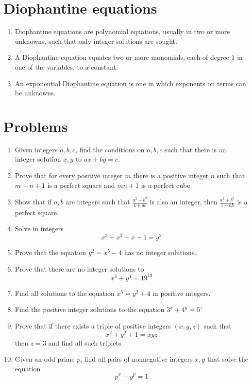 \documentclass{article}
\begin{document}
	
\section*{Diophantine equations}
\begin{enumerate}
	\item 
	Diophantine equations are polynomial equations, usually in two or more unknowns, such that only integer solutions are sought.
	\item 
	A Diophantine equation equates two or more monomials, each of degree $1$ in one of the variables, to a constant.
	\item 
	An exponential Diophantine equation is one in which exponents on terms can be unknowns. 
\end{enumerate}
\section*{Problems}
\begin{enumerate}
	\item 
	Given integers $a,b,c$, find the conditions on $a,b,c$ such that there is an integer solution $x,y$ to
	$ax+by=c$.
	\item %
	Prove that for every positive integer $m$ there is a positive integer $n$ such that $m+n+1$ is a perfect square and $mn+1$ is a perfect cube.
	
	\item %
	Show that if $a,b$ are integers such that $\tfrac{a^2+b^2}{1+ab}$ is also an integer, then $\tfrac{a^2+b^2}{1+ab}$ is a perfect square.
	
	\item %
	Solve in integers
	$$x^3 +x^2 + x + 1 = y^2$$
	
	\item %
	Prove that the equation $y^2=x^5-4$ has no integer solutions.
	
	\item %
	Prove that there are no integer solutions to
	$$x^3 + y^4 = 19^{19}$$
	
	\item %
	Find all solutions to the equation $x^5 = y^2 + 4$ in positive integers.
	
	\item %
	Find the positive integer solutions to the equation
	$3^x+4^y=5^z$	
	
	\item %
	Prove that if there exists a triple of positive integers $(x,y,z)$ such that 
	$$x^2 + y^2+1 = xyz$$
	then $z=3$ and find all such triplets.
	
	\item %
	Given an odd prime $p$, find all pairs of nonnegative integers $x,y$ that solve the equation
	$$p^x - y^p =1$$
	
\end{enumerate}
\end{document}
